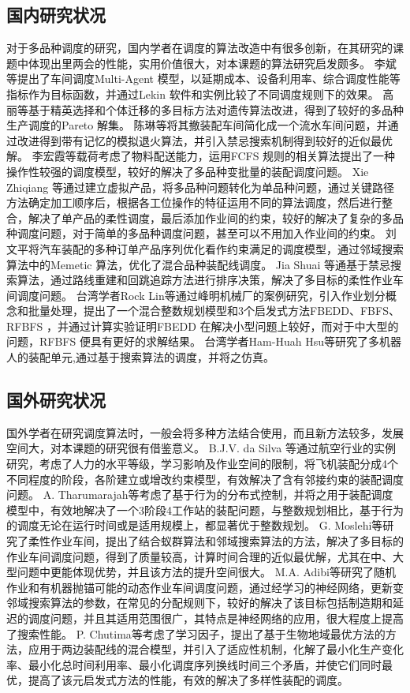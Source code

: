 \subsection{国内研究状况}
对于多品种调度的研究，国内学者在调度的算法改造中有很多创新，在其研究的课题中体现出里两会的性能，实用价值很大，对本课题的算法研究启发颇多。
李斌\cite{李斌2009}等提出了车间调度Multi-Agent 模型，以延期成本、设备利用率、综合调度性能等指标作为目标函数，并通过Lekin 软件和实例比较了不同调度规则下的效果。
高丽\cite{高丽2012}等基于精英选择和个体迁移的多目标方法对遗传算法改进，得到了较好的多品种生产调度的Pareto 解集。
陈琳\cite{陈琳2009}等将其撤装配车间简化成一个流水车间问题，并通过改进得到带有记忆的模拟退火算法，并引入禁忌搜索机制得到较好的近似最优解。
李宏霞\cite{李宏霞2006}等载荷考虑了物料配送能力，运用FCFS 规则的相关算法\cite{lo2002job}提出了一种操作性较强的调度模型，较好的解决了多品种变批量的装配调度问题。
Xie Zhiqiang\cite{xie2010study} 等通过建立虚拟产品，将多品种问题转化为单品种问题，通过关键路径方法确定加工顺序后，根据各工位操作的特征运用不同的算法调度，然后进行整合，解决了单产品的柔性调度，最后添加作业间的约束，较好的解决了复杂的多品种调度问题，对于简单的多品种调度问题，甚至可以不用加入作业间的约束。
刘文平\cite{刘文平2009}将汽车装配的多种订单产品序列优化看作约束满足的调度模型，通过邻域搜索算法中的Memetic 算法，优化了混合品种装配线调度。
Jia Shuai\cite{jia2014path} 等通基于禁忌搜索算法，通过路线重建和回跳追踪方法进行排序决策，解决了多目标的柔性作业车间调度问题。
台湾学者Rock Lin\cite{lin2012case}等通过峰明机械厂的案例研究，引入作业划分概念和批量处理，提出了一个混合整数规划模型和3个启发式方法FBEDD、FBFS、RFBFS ，并通过计算实验证明FBEDD 在解决小型问题上较好，而对于中大型的问题，RFBFS 便具有更好的求解结果。
台湾学者Ham-Huah Hsu\cite{hsu1995fully}等研究了多机器人的装配单元,通过基于搜索算法的调度，并将之仿真。
\subsection{国外研究状况}
国外学者在研究调度算法时，一般会将多种方法结合使用，而且新方法较多，发展空间大，对本课题的研究很有借鉴意义。
B.J.V. da Silva\cite{da2014production} 等通过航空行业的实例研究，考虑了人力的水平等级，学习影响及作业空间的限制，将飞机装配分成4个不同程度的阶段，各阶建立或增改约束模型，有效解决了含有邻接约束的装配调度问题。
A. Tharumarajah\cite{1998distributed}等考虑了基于行为的分布式控制，并将之用于装配调度模型中，有效地解决了一个3阶段4工作站的装配问题，与整数规划相比，基于行为的调度无论在运行时间或是适用规模上，都显著优于整数规划。
G. Moslehi\cite{moslehi2011pareto}等研究了柔性作业车间，提出了结合蚁群算法和邻域搜索算法的方法，解决了多目标的作业车间调度问题，得到了质量较高，计算时间合理的近似最优解，尤其在中、大型问题中更能体现优势，并且该方法的提升空间很大。
M.A. Adibi\cite{adibi2010multi}等研究了随机作业和有机器抛锚可能的动态作业车间调度问题，通过经学习的神经网络，更新变邻域搜索算法的参数，在常见的分配规则下，较好的解决了该目标包括制造期和延迟的调度问题，并且其适用范围很广，其特点是神经网络的应用，很大程度上提高了搜索性能。
P. Chutima\cite{chutima2014pareto}等考虑了学习因子，提出了基于生物地域最优方法的方法，应用于两边装配线的混合模型，并引入了适应性机制，化解了最小化生产变化率、最小化总时间利用率、最小化调度序列换线时间三个矛盾，并使它们同时最优，提高了该元启发式方法的性能，有效的解决了多样性装配的调度。